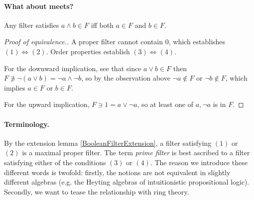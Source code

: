 
\paragraph{What about meets?} Any filter satisfies \( a \wedge b \in F \) iff both \( a \in F \) and \( b \in F \).

\begin{proof}[Proof of equivalence.]
A proper filter cannot contain \( 0 \), which establishes \( (1) \Leftrightarrow (2) \). Order properties establish \( (3) \Leftrightarrow (4) \). 

For the downward implication, see that since \( a \vee b \in F \) then \( F \not\ni \neg(a \vee b) = \neg a \wedge \neg b \), so by the observation above \( \neg a \not\in F \) or \( \neg b \not\in F \), which implies \( a \in F \) or \( b \in F \).

For the upward implication, \( F \ni 1 = a \vee \neg a \), so at least one of \( a, \neg a \) is in \( F \).
\end{proof}

\paragraph{Terminology.} By the extension lemma \ref{BooleanFilterExtension}, a filter satisfying \( (1) \) or   \( (2) \) is a maximal proper filter. The term \emph{prime filter} is best ascribed to a filter satisfying either of the conditions \( (3) \) or \( (4) \). The reason we introduce these different words is twofold: firstly, the notions are not equivalent in slightly different algebras (e.g. the Heyting algebras of intuitionistic propositional logic). Secondly, we want to tease the relationship with ring theory.

